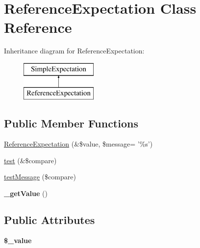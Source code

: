 \hypertarget{class_reference_expectation}{
\section{ReferenceExpectation Class Reference}
\label{class_reference_expectation}
}
Inheritance diagram for ReferenceExpectation:\begin{figure}[H]
\begin{center}
\leavevmode
\includegraphics[height=2.000000cm]{class_reference_expectation}
\end{center}
\end{figure}
\subsection*{Public Member Functions}
\begin{DoxyCompactItemize}
\item 
\hyperlink{class_reference_expectation_aa648fc5c33e580a6b661dbb85e8b5591}{ReferenceExpectation} (\&\$value, \$message= '\%s')
\item 
\hyperlink{class_reference_expectation_a919fb46086bf981f56b77c468c0bf4c4}{test} (\&\$compare)
\item 
\hyperlink{class_reference_expectation_a77c84b888b835ff1255f385d96f6f906}{testMessage} (\$compare)
\item 
\hypertarget{class_reference_expectation_a26b8af808a7ebea4e4b0c0153218e755}{
{\bfseries \_\-getValue} ()}
\label{class_reference_expectation_a26b8af808a7ebea4e4b0c0153218e755}

\end{DoxyCompactItemize}
\subsection*{Public Attributes}
\begin{DoxyCompactItemize}
\item 
\hypertarget{class_reference_expectation_aac0c359c7e0f7abb872b74fdc5681c94}{
{\bfseries \$\_\-value}}
\label{class_reference_expectation_aac0c359c7e0f7abb872b74fdc5681c94}

\end{DoxyCompactItemize}


